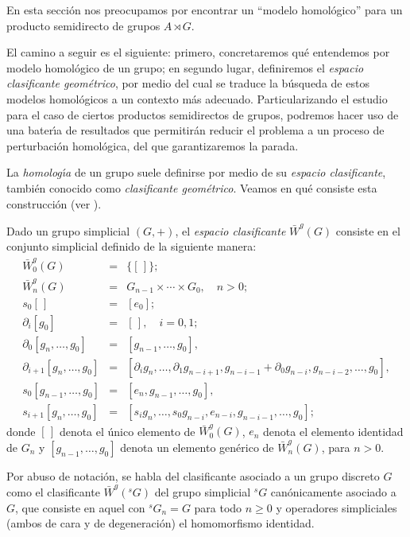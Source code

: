 En esta secci\'{o}n nos preocupamos por encontrar un ``modelo
homol\'{o}gico'' para un producto semidirecto de grupos $A \rtimes
G$.

El camino a seguir es el siguiente: primero, concretaremos qu\'{e}
entendemos por modelo homol\'{o}gico de un grupo; en segundo
lugar, definiremos el {\em espacio clasificante geom\'{e}trico},
por medio del cual se traduce la b\'{u}squeda de
estos modelos homol\'{o}gicos a un contexto m\'{a}s adecuado.
Particularizando el estudio para el caso de ciertos productos
semidirectos de grupos, podremos hacer uso de una bater\'{\i}a de
resultados que permitir\'{a}n reducir el problema a un proceso de
perturbaci\'{o}n homol\'{o}gica, del que garantizaremos la parada.

La {\em homolog\'{\i}a} de un grupo suele definirse por medio de
su {\em espacio clasificante}, tambi\'{e}n conocido como {\em
clasificante geom\'{e}trico}. Veamos en qu\'{e} consiste esta
construcci\'{o}n (ver \cite{May67}).

Dado un grupo simplicial $(G,+)$, el {\em espacio clasificante}
$\bar{W}^g(G)$ consiste en el conjunto simplicial definido de la
siguiente manera:
\begin{eqnarray*}
\bar{W}^g_0(G) & = & \{ [ \, ] \} ; \\ \bar{W}^g_n(G) & = &
G_{n-1} \times \cdots \times G_0, \quad n>0; \\ s_0[ \, ] & = &
[e_0]; \\
\partial _i [g_0] & = & [ \, ], \quad i=0,1; \\
\partial _0[g_n, \ldots ,g_0] & = & [g_{n-1}, \ldots ,g_0], \\
\partial _{i+1}[g_n, \ldots ,g_0] & = & [\partial _i g_n, \ldots , \partial
_1 g_{n-i+1},g_{n-i-1} +\partial _0 g_{n-i},g_{n-i-2}, \ldots
,g_0], \\ s_0[g_{n-1}, \ldots ,g_0] & = & [e_n,g_{n-1}, \ldots
,g_0], \\ s_{i+1}[g_n, \ldots ,g_0] & = & [s_i g_n, \ldots ,s_0
g_{n-i},e_{n-i}, g_{n-i-1}, \ldots ,g_0];
\end{eqnarray*}
donde $[\,]$ denota el \'{u}nico elemento de $\bar{W}^g_0(G)$, $e_n$
denota el elemento identidad de $G_n$ y $[g_{n-1}, \ldots , g_0]$
denota un elemento gen\'{e}rico de $\bar{W}^g_n(G)$, para $n>0$.

Por abuso de notaci\'{o}n, se habla del clasificante asociado a un
grupo discreto $G$ como el clasificante $\bar{W}^g(^sG)$ del grupo
simplicial $^sG$ can\'{o}nicamente asociado a $G$, que consiste en
aquel con $^sG_n=G$ para todo $n \geq 0$ y operadores simpliciales
(ambos de cara y de degeneraci\'{o}n) el homomorfismo identidad.

